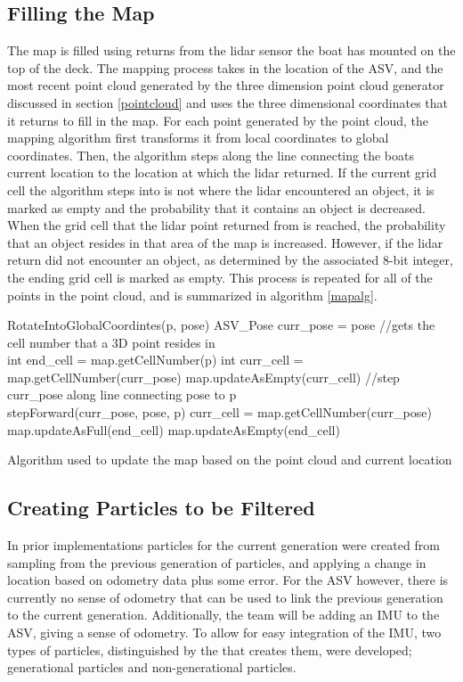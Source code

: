 \documentclass[10pt]{IEEEtran}
\begin{document}
\subsection{Filling the Map}
The map is filled using returns from the lidar sensor the boat has mounted on the top of
the deck.  The mapping process takes in the location of the ASV, and the most recent point
cloud generated by the three dimension point cloud generator discussed in section
\ref{pointcloud} and uses the three dimensional coordinates that it returns to fill in the 
map.  For each point generated by the point cloud, the mapping algorithm first transforms
it from local coordinates to global coordinates.  Then, the algorithm steps along the line
connecting the boats current location to the location at which the lidar returned.  If the
current grid cell the algorithm steps into is not where the lidar encountered an object,
it is marked as empty and the probability that it contains an object is decreased.  When
the grid cell that the lidar point returned from is reached, the probability
that an object resides in that area of the map is increased.  However, if the lidar return
did not encounter an object, as determined by the associated 8-bit integer, the ending grid
cell is marked as empty.  This process is repeated for all of the points in the point cloud,
and is summarized in algorithm \ref{mapalg}.

\begin{algorithm}[H]
	\label{mapalg}
	{
		RotateIntoGlobalCoordintes(p, pose)\;
		ASV\_Pose curr\_pose = pose\;
		//gets the cell number that a 3D point resides in\\
		int end\_cell = map.getCellNumber(p)\;
		int curr\_cell = map.getCellNumber(curr\_pose)\;
		{
			map.updateAsEmpty(curr\_cell)\; 
			//step curr\_pose along line connecting pose to p \\
			stepForward(curr\_pose, pose, p)\;
			curr\_cell = map.getCellNumber(curr\_pose)\;
		}
		{
			map.updateAsFull(end\_cell)\;
		}{
			map.updateAsEmpty(end\_cell)\;
		}
	}

	\caption{Algorithm used to update the map based on the point cloud and current location}
\end{algorithm}


\subsection{Creating Particles to be Filtered}
In prior implementations particles for the current generation were created from sampling from
the previous generation of particles, and applying a change in location based on odometry 
data plus some error.  For the ASV however, there is currently no sense of odometry that 
can be used to link the previous generation to the current generation.  Additionally, the 
team will be adding an IMU to the ASV, giving a sense of odometry.  To allow for easy 
integration of the IMU, two types of particles, distinguished by the that creates them,
were developed; generational particles and non-generational particles.
\end{document}
